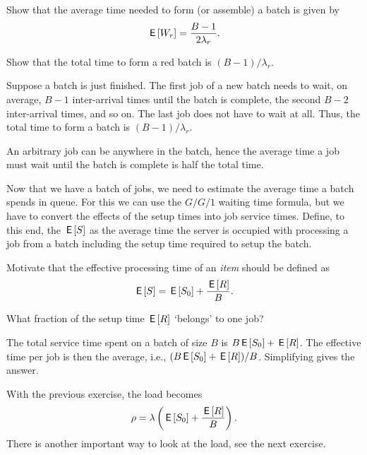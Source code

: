 \begin{exercise}
  Show that the average time needed to form (or assemble) a batch is given by
\begin{equation}\label{eq:79}
 \,\mathsf{E}\left[W_r\right] = \frac{B-1}{2\lambda_r}.
\end{equation}
\begin{hint}
 Show that the total time to form a red batch is $(B-1)/\lambda_r$. 
\end{hint}
\begin{solution}
 Suppose a batch is just finished. The first job of a new batch needs to wait, on average, $B-1$ inter-arrival times until the batch is complete, the second $B-2$ inter-arrival times, and so on. The last job does not have to wait at all. Thus, the total time to form a batch is $(B-1)/\lambda_r$. 

An arbitrary job can be anywhere in the batch, hence the average time a job must wait until the batch is complete is half the total time. 
\end{solution}
\end{exercise}

Now that we have a batch of jobs, we need to estimate the average time a batch spends in queue.
For this we can use the $G/G/1$ waiting time formula, but we have to convert the effects of the setup times into job service times.
Define, to this end, the  $\,\mathsf{E}\left[S\right]$ as the average time the server is occupied with processing a job from a batch including the setup time required to setup the batch.

\begin{exercise}
  Motivate that the effective processing time of an \emph{item} should be defined as
\begin{equation}\label{eq:81}
 \,\mathsf{E}\left[S\right] = \,\mathsf{E}\left[S_0\right] + \frac{\,\mathsf{E}\left[R\right]} B.
\end{equation}
\begin{hint}
 What fraction of the setup time $\,\mathsf{E}\left[R\right]$ `belongs' to one job?
\end{hint}
\begin{solution}
  The total service time spent on a batch of size $B$ is $B \,\mathsf{E}\left[S_0\right] + \,\mathsf{E}\left[R\right]$.
  The effective time per job is then the average, i.e., $(B \,\mathsf{E}\left[S_0\right]+\,\mathsf{E}\left[R\right])/B$.
  Simplifying gives the answer.
\end{solution}
\end{exercise}

With the previous exercise, the load becomes
\begin{equation*}
\rho = \lambda \left(\,\mathsf{E}\left[S_0\right] + \frac{\,\mathsf{E}\left[R\right]}B\right).
\end{equation*}
There is another important way to look at the load, see the next exercise.

